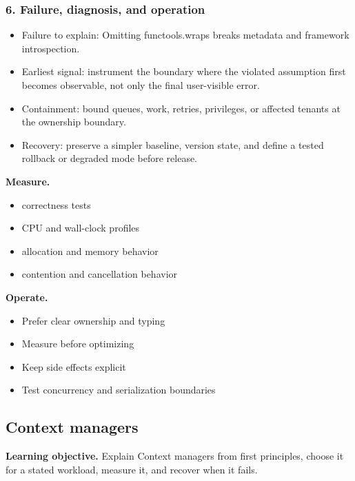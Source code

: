 \subsubsection*{6. Failure, diagnosis, and operation}
\begin{itemize}
\item Failure to explain: Omitting functools.wraps breaks metadata and framework introspection.
\item Earliest signal: instrument the boundary where the violated assumption first becomes observable, not only the final user-visible error.
\item Containment: bound queues, work, retries, privileges, or affected tenants at the ownership boundary.
\item Recovery: preserve a simpler baseline, version state, and define a tested rollback or degraded mode before release.
\end{itemize}
\textbf{Measure.}\begin{itemize}
\item correctness tests
\item CPU and wall-clock profiles
\item allocation and memory behavior
\item contention and cancellation behavior
\end{itemize}
\textbf{Operate.}\begin{itemize}
\item Prefer clear ownership and typing
\item Measure before optimizing
\item Keep side effects explicit
\item Test concurrency and serialization boundaries
\end{itemize}
\subsection{Context managers}
\textbf{Learning objective.} Explain Context managers from first principles, choose it for a stated workload, measure it, and recover when it fails.
